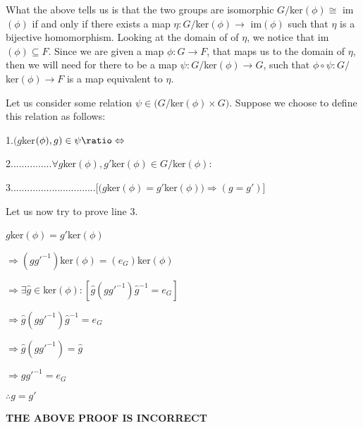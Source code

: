 \documentclass[12pt, a4paper]{article}
\newcommand*{\logeq}{\ratio\Leftrightarrow}
\begin{document}
\begin{flushleft}

What the above tells us is that the two groups are isomorphic $G/$ker$(\phi)\cong$ im$(\phi)$ if and only if there exists a map $\eta\colon G/$ker$(\phi)\rightarrow$ im$(\phi)$ such that $\eta$ is a bijective homomorphism. Looking at the domain of of $\eta$, we notice that im$(\phi)\subseteq F$. Since we are given a map $\phi\colon G\rightarrow F$, that maps us to the domain of $\eta$, then we will need for there to be a map $\psi\colon G/$ker$(\phi)\rightarrow G$, such that $\phi\circ\psi\colon G/$ker$(\phi)\rightarrow F$ is a map equivalent to $\eta$.

\end{flushleft}

Let us consider some relation $\psi\in(G/$ker$(\phi)\times G)$. Suppose we choose to define this relation as follows:\par

\vspace{4mm}

1.\hspace{2mm}$(g$ker$(\phi),g)\in\psi\logeq$\par
\vspace{2mm}
2...............$\forall g$ker$(\phi),g'$ker$(\phi)\in G/$ker$(\phi)\colon$\par
\vspace{2mm}
3...............................$[(g$ker$(\phi)=g'$ker$(\phi))\Rightarrow(g=g')]$\par



\vspace{4mm}

Let us now try to prove line 3.\par

\vspace{4mm}

\hspace{2mm} $g$ker$(\phi)=g'$ker$(\phi)$\par
\vspace{2mm}
\hspace{10mm} $\Rightarrow (gg'^{-1})$ker$(\phi)=(e_G)$ker$(\phi)$\par
\vspace{2mm}
\hspace{10mm} $\Rightarrow\exists\hat{g}\in$ker$(\phi)\colon[\hat{g}(gg'^{-1})\hat{g}^{-1}=e_G]$\par
\vspace{2mm}
\hspace{10mm} $\Rightarrow \hat{g}(gg'^{-1})\hat{g}^{-1}=e_G$\par
\vspace{2mm}
\hspace{10mm} $\Rightarrow \hat{g}(gg'^{-1})=\hat{g}$\par
\vspace{2mm}
\hspace{10mm} $\Rightarrow gg'^{-1}=e_G$\par
\vspace{2mm}
\hspace{2mm} $\therefore g=g'$\par

\vspace{4mm}

\textbf{THE ABOVE PROOF IS INCORRECT}
\end{document}
